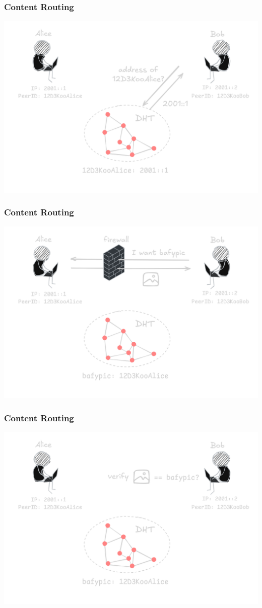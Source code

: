 \documentclass{../shipyard-slide}
\begin{document}
\begin{frame}
  \frametitle{Content Routing}
  \begin{center}
    \includegraphics[width=.7\textwidth]{resources/routing-peer-lookup.png}
  \end{center}
\end{frame}
\begin{frame}
  \frametitle{Content Routing}
  \begin{center}
    \includegraphics[width=.7\textwidth]{resources/routing-transfer-firewall.png}
  \end{center}
\end{frame}
\begin{frame}
  \frametitle{Content Routing}
  \begin{center}
    \includegraphics[width=.7\textwidth]{resources/routing-verification.png}
  \end{center}
\end{frame}
\end{document}
